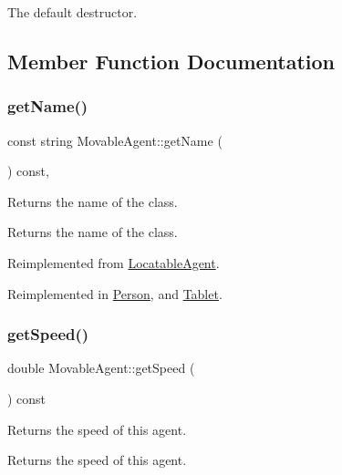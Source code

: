 The default destructor. 

\subsection{Member Function Documentation}
\mbox{\label{class_movable_agent_abcc1218876c39c996f2cb1eba2b96379}} 
\subsubsection{\texorpdfstring{get\+Name()}{getName()}}
{\footnotesize\ttfamily const string Movable\+Agent\+::get\+Name (\begin{DoxyParamCaption}{ }\end{DoxyParamCaption}) const\hspace{0.3cm}{\ttfamily [override]}, {\ttfamily [virtual]}}

Returns the name of the class. \begin{DoxyReturn}{Returns}
the name of the class. 
\end{DoxyReturn}


Reimplemented from \hyperlink{class_locatable_agent_a754105958bb672744b525538f1584a7b}{Locatable\+Agent}.



Reimplemented in \hyperlink{class_person_aa2a6f8d7f1d94045a03ca578f2ed272c}{Person}, and \hyperlink{class_tablet_adc7196aaee1e9714236b7cd8825d5826}{Tablet}.

\mbox{\label{class_movable_agent_a12fcdaee60f5bb29f15fe113a7dacaac}} 
\subsubsection{\texorpdfstring{get\+Speed()}{getSpeed()}}
{\footnotesize\ttfamily double Movable\+Agent\+::get\+Speed (\begin{DoxyParamCaption}{ }\end{DoxyParamCaption}) const}

Returns the speed of this agent. \begin{DoxyReturn}{Returns}
the speed of this agent. 
\end{DoxyReturn}
\mbox{\label{class_movable_agent_a88b617f0e78c817634e5b587da045ab0}} 
